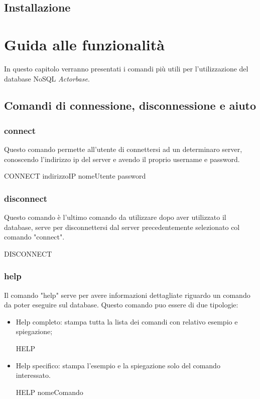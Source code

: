 \documentclass[a4paper]{article}
\begin{document}
			\subsection{Installazione}
	
	\newpage
	\section{Guida alle funzionalità}
	In questo capitolo verranno presentati i comandi più utili per l'utilizzazione del database NoSQL \emph{Actorbase}.
	
		\subsection{Comandi di connessione, disconnessione e aiuto}
			\subsubsection{connect}
			Questo comando permette all'utente di connettersi ad un determinaro server, conoscendo l'indirizzo ip del server e avendo il proprio username e password.
			\begin{center}
				CONNECT indirizzoIP nomeUtente password 
			\end{center}
			\subsubsection{disconnect}
			Questo comando è l'ultimo comando da utilizzare dopo aver utilizzato il database, serve per disconnettersi dal server precedentemente selezionato col comando "connect".
			\begin{center}
				DISCONNECT
			\end{center}
			\subsubsection{help}
			Il comando "help" serve per avere informazioni dettagliate riguardo un comando da poter eseguire sul database. Questo comando puo essere di due tipologie:
			\begin{itemize}
				\item Help completo: stampa tutta la lista dei comandi con relativo esempio e spiegazione;
				\begin{center}
						HELP
				\end{center}
				\item Help specifico: stampa l'esempio e la spiegazione solo del comando interessato.
				\begin{center}
						HELP nomeComando
				\end{center}
			\end{itemize}
\end{document}
